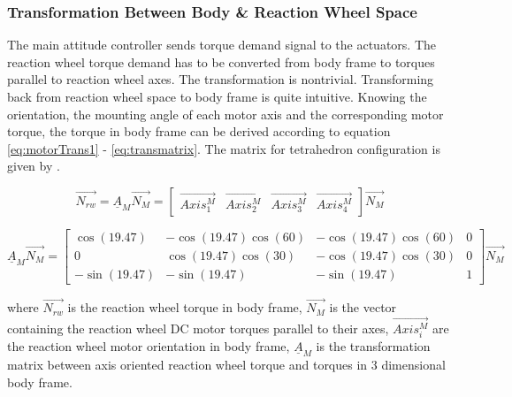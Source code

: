 
\subsubsection{Transformation Between Body \& Reaction Wheel Space}

The main attitude controller sends torque demand signal to the actuators. The reaction wheel torque demand has to be converted from body frame to torques parallel to reaction wheel axes. The transformation is nontrivial. Transforming back from reaction wheel space to body frame is quite intuitive. Knowing the orientation, the mounting angle of each motor axis and the corresponding motor torque, the torque in body frame can be derived according to equation \ref{eq:motorTrans1} - \ref{eq:transmatrix}. The matrix for tetrahedron configuration is given by \cite{reactionWheelConfigThesis}.

\begin{equation}
\label{eq:motorTrans1}
\vec{N_{rw}} = \underline{A}_{M} \vec{N_{M}} = \begin{bmatrix}
\vec{Axis^{M}_{1}}       & \vec{Axis^{M}_{2}}   & \vec{Axis^{M}_{3}}   & \vec{Axis^{M}_{4}} 
\end{bmatrix} \vec{N_{M}}
\end{equation}

\begin{equation}
\underline{A}_{M} \vec{N_{M}}  = 
\begin{bmatrix}
\cos(19.47)       & -\cos(19.47) \cos(60)  &  -\cos(19.47) \cos(60)  & 0 \\
0       & \cos(19.47) \cos(30)  &  -\cos(19.47) \cos(30)  & 0 \\
-\sin(19.47)       & -\sin(19.47)   &  -\sin(19.47)   & 1
\end{bmatrix} \vec{N_{M}}
\label{eq:transmatrix}
\end{equation}

where $\vec{N_{rw}}$ is the reaction wheel torque in body frame, $\vec{N_{M}}$ is the vector containing the reaction wheel DC motor torques parallel to their axes, $\vec{Axis^{M}_{i}}$ are the reaction wheel motor orientation in body frame, $\underline{A}_{M}$ is the transformation matrix between axis oriented reaction wheel torque and torques in 3 dimensional body frame.



